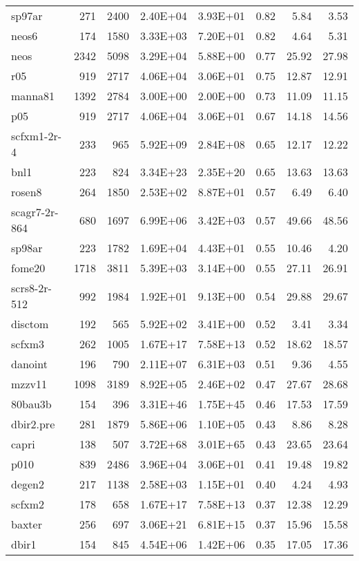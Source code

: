 \documentclass[10pt]{article}
\begin{document}
\begin{longtable}{|l|r|r|r|r|r|r|r|}
sp97ar	&	271	&	2400	&	2.40E+04	&	3.93E+01	&	0.82	&	5.84	&	3.53	\\
neos6	&	174	&	1580	&	3.33E+03	&	7.20E+01	&	0.82	&	4.64	&	5.31	\\
neos	&	2342	&	5098	&	3.29E+04	&	5.88E+00	&	0.77	&	25.92	&	27.98	\\
r05	&	919	&	2717	&	4.06E+04	&	3.06E+01	&	0.75	&	12.87	&	12.91	\\
manna81	&	1392	&	2784	&	3.00E+00	&	2.00E+00	&	0.73	&	11.09	&	11.15	\\
p05	&	919	&	2717	&	4.06E+04	&	3.06E+01	&	0.67	&	14.18	&	14.56	\\
scfxm1-2r-4	&	233	&	965	&	5.92E+09	&	2.84E+08	&	0.65	&	12.17	&	12.22	\\
bnl1	&	223	&	824	&	3.34E+23	&	2.35E+20	&	0.65	&	13.63	&	13.63	\\
rosen8	&	264	&	1850	&	2.53E+02	&	8.87E+01	&	0.57	&	6.49	&	6.40	\\
scagr7-2r-864	&	680	&	1697	&	6.99E+06	&	3.42E+03	&	0.57	&	49.66	&	48.56	\\
sp98ar	&	223	&	1782	&	1.69E+04	&	4.43E+01	&	0.55	&	10.46	&	4.20	\\
fome20	&	1718	&	3811	&	5.39E+03	&	3.14E+00	&	0.55	&	27.11	&	26.91	\\
scrs8-2r-512	&	992	&	1984	&	1.92E+01	&	9.13E+00	&	0.54	&	29.88	&	29.67	\\
disctom	&	192	&	565	&	5.92E+02	&	3.41E+00	&	0.52	&	3.41	&	3.34	\\
scfxm3	&	262	&	1005	&	1.67E+17	&	7.58E+13	&	0.52	&	18.62	&	18.57	\\
danoint	&	196	&	790	&	2.11E+07	&	6.31E+03	&	0.51	&	9.36	&	4.55	\\
mzzv11	&	1098	&	3189	&	8.92E+05	&	2.46E+02	&	0.47	&	27.67	&	28.68	\\
80bau3b	&	154	&	396	&	3.31E+46	&	1.75E+45	&	0.46	&	17.53	&	17.59	\\
dbir2.pre	&	281	&	1879	&	5.86E+06	&	1.10E+05	&	0.43	&	8.86	&	8.28	\\
capri	&	138	&	507	&	3.72E+68	&	3.01E+65	&	0.43	&	23.65	&	23.64	\\
p010	&	839	&	2486	&	3.96E+04	&	3.06E+01	&	0.41	&	19.48	&	19.82	\\
degen2	&	217	&	1138	&	2.58E+03	&	1.15E+01	&	0.40	&	4.24	&	4.93	\\
scfxm2	&	178	&	658	&	1.67E+17	&	7.58E+13	&	0.37	&	12.38	&	12.29	\\
baxter	&	256	&	697	&	3.06E+21	&	6.81E+15	&	0.37	&	15.96	&	15.58	\\
dbir1	&	154	&	845	&	4.54E+06	&	1.42E+06	&	0.35	&	17.05	&	17.36	\\

\end{longtable}
\end{document}

